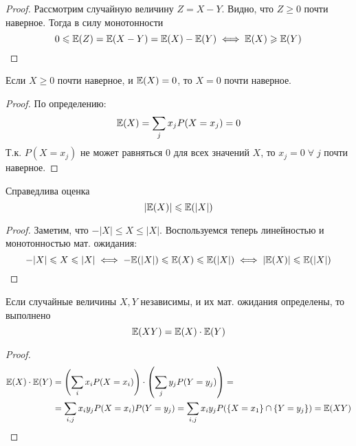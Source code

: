 \begin{proof}
    Рассмотрим случайную величину $Z = X - Y$. Видно, что $Z \geq 0$ почти наверное. Тогда в силу монотонности
    \[
        0 \leqslant \mathbb{E}(Z) = \mathbb{E}(X - Y) = \mathbb{E}(X) - \mathbb{E}(Y) \iff \mathbb{E}(X) \geqslant \mathbb{E}(Y)
    \]
\end{proof}
\begin{proposal}
    Если $X \geq 0$ почти наверное, и $\mathbb{E}(X) = 0$, то $X = 0$ почти наверное.
\end{proposal}
\begin{proof}
    По определению:
    \[
        \mathbb{E}(X) = \sum\limits_{j} x_j P(X = x_j) = 0
    \]
    Т.к. $P(X = x_j)$ не может равняться $0$ для всех значений $X$, то $x_j = 0\;\forall\; j$ почти наверное.
\end{proof}
\begin{proposal}
    Справедлива оценка
    \[
        |\mathbb{E}(X)| \leqslant \mathbb{E}(|X|)
    \]
\end{proposal}
\begin{proof}
    Заметим, что $-|X| \leq X \leq |X|$. Воспользуемся теперь линейностью и монотонностью мат. ожидания:
    \[
        -|X| \leqslant X \leqslant |X| \iff -\mathbb{E}(|X|) \leqslant \mathbb{E}(X) \leqslant \mathbb{E}(|X|) \iff |\mathbb{E}(X)| \leqslant \mathbb{E}(|X|)
    \]
\end{proof}
\begin{proposal}
    Если случайные величины $X, Y$ независимы, и их мат. ожидания определены, то выполнено
    \[
        \mathbb{E}(XY) = \mathbb{E}(X) \cdot \mathbb{E}(Y)
    \]
\end{proposal}
\begin{proof}
    \begin{align*}
        \mathbb{E}(X) \cdot \mathbb{E}(Y) &= \left( \sum\limits_{i} x_i P(X = x_i) \right) \cdot
        \left( \sum\limits_{j} y_j P(Y = y_j) \right) =\\
        &=\sum\limits_{i, j} x_{i}y_j P(X = x_i)P(Y = y_j) =
        \sum\limits_{i, j} x_i y_j P(\{X = x_1\} \cap \{Y = y_j\}) = \mathbb{E}(XY)
    \end{align*}
\end{proof}
\begin{comment}
    Второй переход справедлив в силу абсолютной сходимости рядов. Четвёртый переход справедлив в силу
    независимости $X, Y$.
\end{comment}

